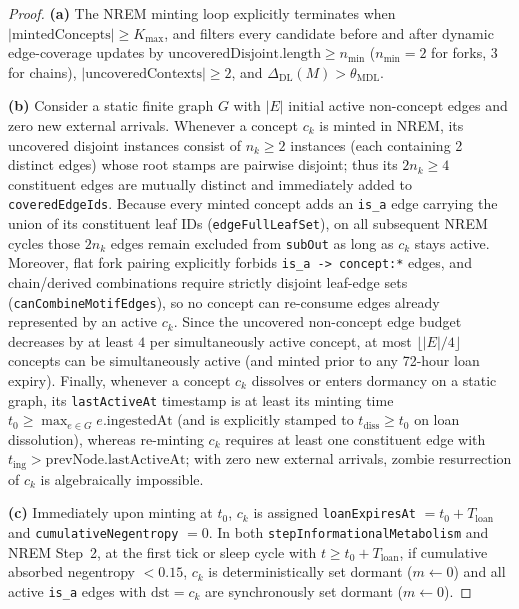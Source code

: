 \begin{proof}
\textbf{(a)} The NREM minting loop explicitly terminates when $|\text{mintedConcepts}| \ge K_{\max}$, and filters every candidate before and after dynamic edge-coverage updates by $\mathrm{uncoveredDisjoint.length} \ge n_{\min}$ ($n_{\min} = 2$ for forks, $3$ for chains), $|\text{uncoveredContexts}| \ge 2$, and $\Delta_{\mathrm{DL}}(M) > \theta_{\mathrm{MDL}}$.

\textbf{(b)} Consider a static finite graph $G$ with $|E|$ initial active non-concept edges and zero new external arrivals. Whenever a concept $c_k$ is minted in NREM, its uncovered disjoint instances consist of $n_k \ge 2$ instances (each containing 2 distinct edges) whose root stamps are pairwise disjoint; thus its $2 n_k \ge 4$ constituent edges are mutually distinct and immediately added to \texttt{coveredEdgeIds}. Because every minted concept adds an \texttt{is\_a} edge carrying the union of its constituent leaf IDs (\texttt{edgeFullLeafSet}), on all subsequent NREM cycles those $2 n_k$ edges remain excluded from \texttt{subOut} as long as $c_k$ stays active. Moreover, flat fork pairing explicitly forbids \texttt{is\_a -> concept:*} edges, and chain/derived combinations require strictly disjoint leaf-edge sets (\texttt{canCombineMotifEdges}), so no concept can re-consume edges already represented by an active $c_k$. Since the uncovered non-concept edge budget decreases by at least $4$ per simultaneously active concept, at most $\lfloor |E|/4 \rfloor$ concepts can be simultaneously active (and minted prior to any 72-hour loan expiry). Finally, whenever a concept $c_k$ dissolves or enters dormancy on a static graph, its \texttt{lastActiveAt} timestamp is at least its minting time $t_0 \ge \max_{e \in G} e.\mathrm{ingestedAt}$ (and is explicitly stamped to $t_{\mathrm{diss}} \ge t_0$ on loan dissolution), whereas re-minting $c_k$ requires at least one constituent edge with $t_{\mathrm{ing}} > \mathrm{prevNode.lastActiveAt}$; with zero new external arrivals, zombie resurrection of $c_k$ is algebraically impossible.

\textbf{(c)} Immediately upon minting at $t_0$, $c_k$ is assigned \texttt{loanExpiresAt} $= t_0 + T_{\mathrm{loan}}$ and \texttt{cumulativeNegentropy} $= 0$. In both \texttt{stepInformationalMetabolism} and NREM Step~2, at the first tick or sleep cycle with $t \ge t_0 + T_{\mathrm{loan}}$, if cumulative absorbed negentropy $< 0.15$, $c_k$ is deterministically set dormant ($m \leftarrow 0$) and all active \texttt{is\_a} edges with $\mathrm{dst} = c_k$ are synchronously set dormant ($m \leftarrow 0$).
\end{proof}


